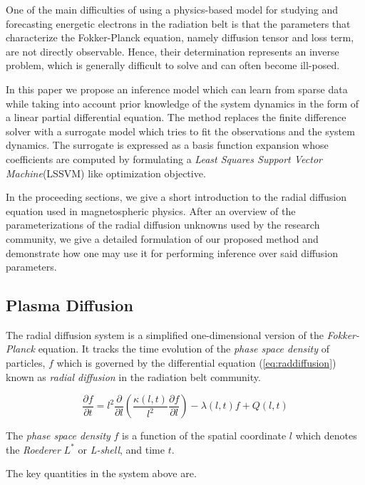 \documentclass{article}
\begin{document}
One of the main difficulties of using a physics-based model for studying and 
forecasting energetic electrons in the radiation belt is that the parameters 
that characterize the Fokker-Planck equation, namely diffusion tensor and loss term,
are not directly observable. Hence, their determination represents an inverse problem,
which is generally difficult to solve and can often become ill-posed.

In this paper we propose an inference model which can learn from sparse
data while taking into account prior knowledge of the system dynamics
in the form of a linear partial differential equation. The method replaces
the finite difference solver with a surrogate model which tries to fit
the observations and the system dynamics. The surrogate is expressed as
a basis function expansion whose coefficients are computed by formulating
a \emph{Least Squares Support Vector Machine}(LSSVM) like optimization
objective.

In the proceeding sections, we give a short introduction to the radial 
diffusion equation used in magnetospheric physics. After an overview of 
the parameterizations of the radial diffusion unknowns used by the research community, 
we give a detailed formulation of our proposed method and demonstrate 
how one may use it for performing inference over said diffusion parameters.

\subsection{Plasma Diffusion}

The radial diffusion system is a simplified one-dimensional version of
the \emph{Fokker-Planck} equation. It tracks the time evolution of the
\emph{phase space density} of particles, $f$ which is governed by the
differential equation (\ref{eq:raddiffusion}) known as \emph{radial
  diffusion} in the radiation belt community\citep{JGRA:JGRA9345}.

\begin{equation}\label{eq:raddiffusion}
  \frac{\partial{f}}{\partial{t}} = l^2 \frac{\partial}{\partial{l}}\left( \frac{\kappa(l,
      t)}{l^{2}} \frac{\partial{f}}{\partial{l}} \right) - \lambda(l,
  t) f +  Q(l, t)
\end{equation}

The \emph{phase space density} $f$ is a function of the spatial
coordinate $l$ which denotes the \emph{Roederer} $L^*$ or
\emph{L-shell}, and time $t$.

The key quantities in the system above are.
\end{document}
